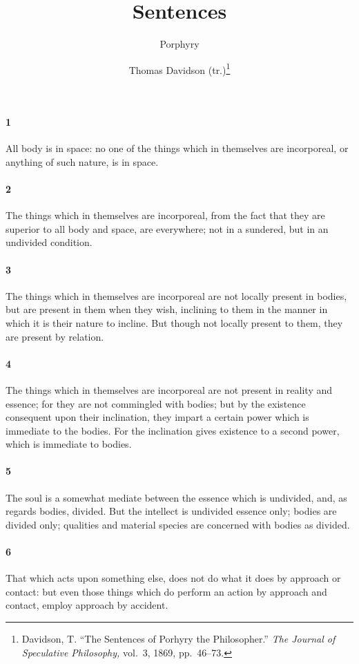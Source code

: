 \documentclass[12pt]{article}
\title{Sentences}
\author{Porphyry \and Thomas Davidson (tr.)\footnote{Davidson, T. ``The
Sentences of Porhyry the Philosopher.'' \textit{The Journal of Speculative
Philosophy,} vol.~3, 1869, pp.~46--73.}} \date{}
\begin{document}
\maketitle

\paragraph{1} All body is in space: no one of the things which in themselves
are incorporeal, or anything of such nature, is in space.

\paragraph{2} The things which in themselves are incorporeal, from the fact
that they are superior to all body and space, are everywhere; not in a
sundered, but in an undivided condition.

\paragraph{3} The things which in themselves are incorporeal are not locally
present in bodies, but are present in them when they wish, inclining to them in
the manner in which it is their nature to incline. But though not locally
present to them, they are present by relation.

\paragraph{4} The things which in themselves are incorporeal are not present in
reality and essence; for they are not commingled with bodies; but by the
existence consequent upon their inclination, they impart a certain power which
is immediate to the bodies. For the inclination gives existence to a second
power, which is immediate to bodies.

\paragraph{5} The soul is a somewhat mediate between the essence which is
undivided, and, as regards bodies, divided. But the intellect is undivided
essence only; bodies are divided only; qualities and material species are
concerned with bodies as divided.

\paragraph{6} That which acts upon something else, does not do what it does by
approach or contact: but even those things which do perform an action by
approach and contact, employ approach by accident.
\end{document}
